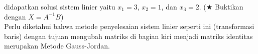 didapatkan solusi sistem linier yaitu $x_1=3$, $x_2=1$, dan $x_3=2$. ($\bigstar$ Buktikan dengan $X=A^{-1}B$) \\

Perlu diketahui bahwa metode penyelesaian sistem linier seperti ini (transformasi baris) dengan tujuan mengubah matriks di bagian kiri menjadi matriks identitas merupakan Metode Gauss-Jordan.
